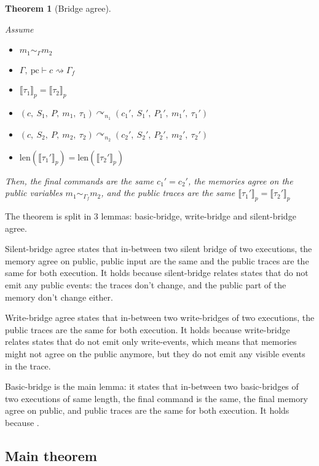 \documentclass[10pt]{article}
\newcommand{\pc}{\mathrm{pc}}
\newcommand{\ctx}{\Gamma}
\newcommand{\typing}[4]{ #1,~#2 \vdash #3 \rightsquigarrow #4}
\newcommand{\bridge}[3] { #1 \curvearrowright_{#2} #3 }
\newcommand{\pproj}[1]{\llbracket #1 \rrbracket_{p}}
\newcommand{\agree}[3]{#2 \sim_{#1} #3}
\newtheorem{theorem}{Theorem}
\begin{document}
\begin{theorem}[Bridge agree]\label{thm:agree}

  Assume
  \begin{itemize}
    \item $\agree{\ctx}{m_{1}}{m_{2}}$
    \item $\typing{\ctx}{\pc}{c}{\ctx_{f}}$
    \item $\pproj{\tau_{1}} = \pproj{\tau_{2}}$
    \item $\bridge{(c,~S_{1},~P,~m_{1},~\tau_{1})}{n_{1}}(c_{1}',~S_{1}',~P_{1}',~m_{1}',~\tau_{1}')$
    \item $\bridge{(c,~S_{2},~P,~m_{2},~\tau_{2})}{n_{2}}(c_{2}',~S_{2}',~P_{2}',~m_{2}',~\tau_{2}')$
    \item $\mathrm{len}(\pproj{\tau_{1}'}) = \mathrm{len}(\pproj{\tau_{2}'})$
  \end{itemize}

  Then,
  the final commands are the same $c_{1}' = c_{2}'$,
  the memories agree on the public variables $\agree{\ctx_{f}}{m_{1}}{m_{2}}$, %
  and the public traces are the same $\pproj{\tau_{1}'} = \pproj{\tau_{2}'}$
\end{theorem}

The theorem is split in 3 lemmas: basic-bridge, write-bridge and silent-bridge agree.

Silent-bridge agree states that in-between two silent bridge of two executions,
the memory agree on public, public input are the same and the public
traces are the same for both execution. It holds because silent-bridge relates states that do not
emit any public events: the traces don't change, and the public part of the memory don't change
either.

Write-bridge agree states that in-between two write-bridges of two executions,
the public traces are the same for both execution. It holds because write-bridge relates states that
do not emit only write-events, which means that memories might not agree on the public anymore, but
they do not emit any visible events in the trace.

Basic-bridge is the main lemma: it states that in-between two basic-bridges of two executions of
same length, the final command is the same, the final memory agree on public, and
public traces are the same for both execution.
It holds because .


\subsection{Main theorem}%
\label{subsec:main_theorem}
\end{document}
